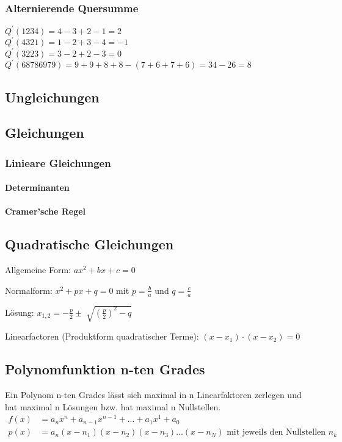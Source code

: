 \subsubsection{Alternierende Quersumme}

$Q^{\prime}(1234)=4-3+2-1=2$\\
$Q^{\prime}(4321)=1-2+3-4=-1$\\
$Q^{\prime}(3223)=3-2+2-3=0$\\
$Q^{\prime}(68786979)=9+9+8+8-(7+6+7+6)=34-26=8$





\subsection{Ungleichungen}
\subsection{Gleichungen}
\subsubsection{Linieare Gleichungen}
\paragraph{Determinanten}
\paragraph{Cramer'sche Regel}
\subsection{Quadratische Gleichungen}
Allgemeine Form:
$ ax^2 + bx + c = 0 $

Normalform:
$ x^2 + px + q = 0 $ mit $p=\frac{b}{a}$ und $q=\frac{c}{a}$

Lösung: $x_{1,2}= - \frac{p}{2} \pm \sqrt[]{( \frac{p}{2})^2 -q }$

Linearfactoren (Produktform quadratischer Terme): $(x-x_1)\cdot (x-x_2 )=0$

\subsection{Polynomfunktion n-ten Grades}
Ein Polynom n-ten Grades lässt sich maximal in n Linearfaktoren zerlegen und hat maximal n Lösungen bzw. hat maximal n Nullstellen.
\begin{align*}
f(x) &= a_nx^n+a_{n-1}x^{n-1}+...+a_1x^1+a_0 \\
p(x) &=a_n(x-n_1)(x-n_2)(x-n_3)...(x-n_N) \textrm{ mit jeweils den Nullstellen } n_k
\end{align*}
